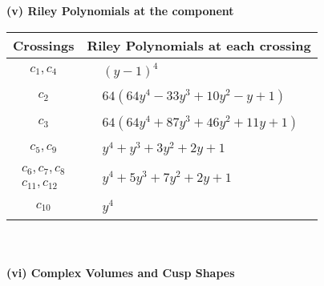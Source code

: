 \documentclass[1p]{elsarticle_modified}
\theoremstyle{definition}
\begin{document}
\newpage\renewcommand{\arraystretch}{1}
\flushleft \textbf{(v) Riley Polynomials at the component}\newline \\
\begin{tabular}{m{50pt}|m{274pt}}
Crossings & \hspace{64pt}Riley Polynomials at each crossing \\
\hline $$\begin{aligned}c_{1},c_{4}\end{aligned}$$&$\begin{aligned}
&(y-1)^4
\end{aligned}$\\
\hline $$\begin{aligned}c_{2}\end{aligned}$$&$\begin{aligned}
&64(64 y^4-33 y^3+10 y^2- y+1)
\end{aligned}$\\
\hline $$\begin{aligned}c_{3}\end{aligned}$$&$\begin{aligned}
&64(64 y^4+87 y^3+46 y^2+11 y+1)
\end{aligned}$\\
\hline $$\begin{aligned}c_{5},c_{9}\end{aligned}$$&$\begin{aligned}
&y^4+y^3+3 y^2+2 y+1
\end{aligned}$\\
\hline $$\begin{aligned}c_{6},c_{7},c_{8}\\c_{11},c_{12}\end{aligned}$$&$\begin{aligned}
&y^4+5 y^3+7 y^2+2 y+1
\end{aligned}$\\
\hline $$\begin{aligned}c_{10}\end{aligned}$$&$\begin{aligned}
&y^4
\end{aligned}$\\
\hline
\end{tabular}\\~\\
\newpage\flushleft \textbf{(vi) Complex Volumes and Cusp Shapes}
\end{document}
